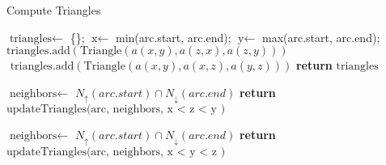 \begin{algorithm}
    \caption{Compute Triangles}
    \begin{algorithmic}[1]
    
    \State $\text{triangles} \gets$ \{\}; 
    $\text{x} \gets$ min(arc.start, arc.end);
    $\text{y} \gets$ max(arc.start, arc.end);
                 $\text{triangles.add}(\text{Triangle}(a(x,y), a(z, x), a(z,y)))$
            \Else  $\text{ triangles.add}(\text{Triangle}(a(x,y), a(x,z), a(y,z)))$
            \EndIf
        \EndIf
    \EndFor
    \State \textbf{return} $\text{triangles}$
    \EndProcedure
    
    \State $\text{neighbors} \gets$ $N_\uparrow(arc.start) \cap N_\downarrow(arc.end)$
    \State \textbf{return} $\text{updateTriangles(arc, neighbors, x < z < y )}$
    \EndProcedure
    
    \State $\text{neighbors} \gets$ $N_\uparrow(arc.start) \cap N_\downarrow(arc.end)$
    \State \textbf{return} $\text{updateTriangles(arc, neighbors, x < y < z )}$
    \EndProcedure
    
    \end{algorithmic}
    \end{algorithm}
    